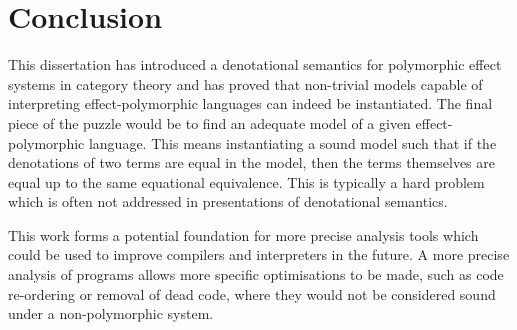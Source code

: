 \documentclass{Report}
\begin{document}
\chapter{Conclusion}
This dissertation has introduced a denotational semantics for polymorphic effect systems in category theory and has proved that non-trivial models capable of interpreting effect-polymorphic languages can indeed be instantiated. The final piece of the puzzle would be to find an adequate model of a given effect-polymorphic language. This means instantiating a sound model such that if the denotations of two terms are equal in the model, then the terms themselves are equal up to the same equational equivalence. This is typically a hard problem which is often not addressed in presentations of denotational semantics.

This work forms a potential foundation for more precise analysis tools which could be used to improve compilers and interpreters in the future. A more precise analysis of programs allows more specific optimisations to be made, such as code re-ordering or removal of dead code, where they would not be considered sound under a non-polymorphic system.
\end{document}
